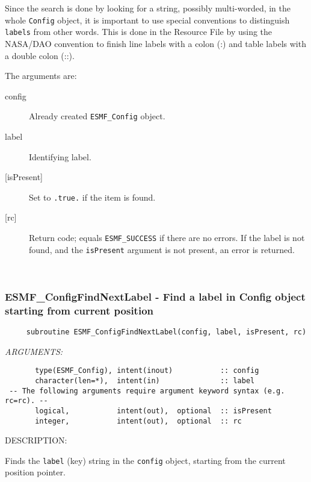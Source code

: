      Since the search is done by looking for a string, possibly multi-worded,
     in the whole {\tt Config} object, it is important to use special 
     conventions to distinguish {\tt labels} from other words. This is done 
     in the Resource File by using the NASA/DAO convention to finish
     line labels with a colon (:) and table labels with a double colon (::).
  
  
     The arguments are:
     \begin{description}
     \item [config]
       Already created {\tt ESMF\_Config} object.
     \item [label]
       Identifying label. 
     \item [{[isPresent]}]
       Set to {\tt .true.} if the item is found.
     \item [{[rc]}]
       Return code; equals {\tt ESMF\_SUCCESS} if there are no errors.
       If the label is not found, and the {\tt isPresent} argument is
       not present, an error is returned.
     \end{description}
   
 
\mbox{}\hrulefill\ 
 

  \subsubsection [ESMF\_ConfigFindNextLabel] {ESMF\_ConfigFindNextLabel - Find a label in Config object starting from current position}


  
\begin{verbatim}     subroutine ESMF_ConfigFindNextLabel(config, label, isPresent, rc)
 \end{verbatim}{\em ARGUMENTS:}
\begin{verbatim}       type(ESMF_Config), intent(inout)           :: config
       character(len=*),  intent(in)              :: label
 -- The following arguments require argument keyword syntax (e.g. rc=rc). --
       logical,           intent(out),  optional  :: isPresent
       integer,           intent(out),  optional  :: rc
 \end{verbatim}
{\sf DESCRIPTION:\\ }

Finds the {\tt label} (key) string in the {\tt config} object, 
     starting from the current position pointer.
  

